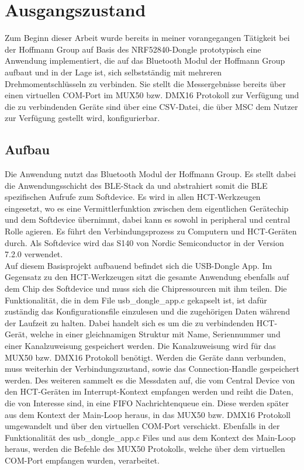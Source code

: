 \section{Ausgangszustand}
Zum Beginn dieser Arbeit wurde bereits in meiner vorangegangen Tätigkeit bei der Hoffmann Group auf Basis des NRF52840-Dongle prototypisch eine Anwendung implementiert, die auf das Bluetooth Modul der Hoffmann Group aufbaut und in der Lage ist, sich selbstständig mit mehreren Drehmomentschlüsseln zu verbinden. Sie stellt die Messergebnisse bereits über einen virtuellen COM-Port im MUX50 bzw. DMX16 Protokoll zur Verfügung und die zu verbindenden Geräte sind über eine CSV-Datei, die über MSC dem Nutzer zur Verfügung gestellt wird, konfigurierbar.

\subsection{Aufbau}
Die Anwendung nutzt das Bluetooth Modul der Hoffmann Group. Es stellt dabei die Anwendungsschicht des BLE-Stack da und abstrahiert somit die BLE spezifischen Aufrufe zum Softdevice. Es wird in allen HCT-Werkzeugen eingesetzt, wo es eine Vermittlerfunktion zwischen dem eigentlichen Gerätechip und dem Softdevice übernimmt, dabei kann es sowohl in peripheral und central Rolle agieren. Es führt den Verbindungsprozess zu Computern und HCT-Geräten durch. Als Softdevice wird das S140 von Nordic Semiconductor in der Version 7.2.0 verwendet. \\
Auf diesem Basisprojekt aufbauend befindet sich die USB-Dongle App. Im Gegensatz zu den HCT-Werkzeugen sitzt die gesamte Anwendung ebenfalls auf dem Chip des Softdevice und muss sich die Chipressourcen mit ihm teilen. Die Funktionalität, die in dem File usb\_dongle\_app.c gekapselt ist, ist dafür zuständig das Konfigurationsfile einzulesen und die zugehörigen Daten während der Laufzeit zu halten. Dabei handelt sich es um die zu verbindenden HCT-Gerät, welche in einer gleichnamigen Struktur mit Name, Seriennummer und einer Kanalzuweisung gespeichert werden. Die Kanalzuweisung wird für das MUX50 bzw. DMX16 Protokoll benötigt. Werden die Geräte dann verbunden, muss weiterhin der Verbindungszustand, sowie das Connection-Handle gespeichert werden. Des weiteren sammelt es die Messdaten auf, die vom Central Device von den HCT-Geräten im Interrupt-Kontext empfangen werden und reiht die Daten, die von Interesse sind, in eine FIFO Nachrichtenqueue ein. Diese werden später aus dem Kontext der Main-Loop heraus, in das MUX50 bzw. DMX16 Protokoll umgewandelt und über den virtuellen COM-Port verschickt. Ebenfalls in der Funktionalität des usb\_dongle\_app.c Files und aus dem Kontext des Main-Loop heraus, werden die Befehle des MUX50 Protokolls, welche über dem virtuellen COM-Port empfangen wurden, verarbeitet.\\
